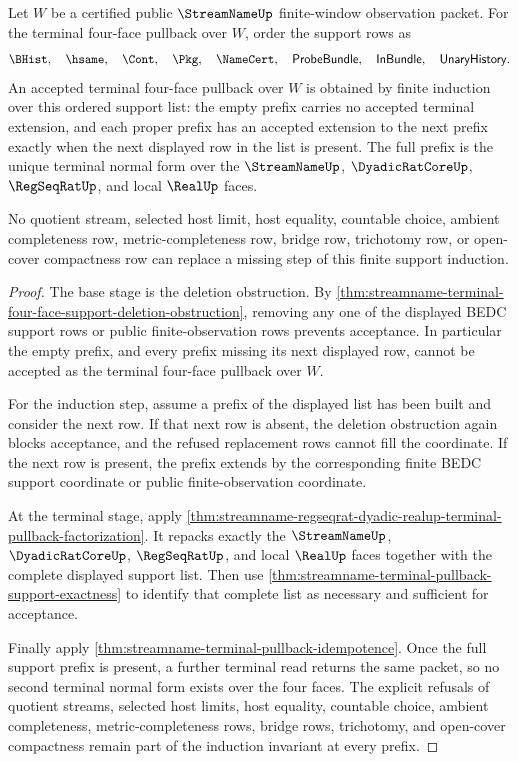 \begin{theorem}
\label{thm:streamname-terminal-pullback-support-induction}
Let $W$ be a certified public $\StreamNameUp$ finite-window observation packet.
For the terminal four-face pullback over $W$, order the support rows as
$$
\BHist,\quad \hsame,\quad \Cont,\quad \Pkg,\quad \NameCert,\quad
\mathsf{ProbeBundle},\quad \mathsf{InBundle},\quad
\mathsf{UnaryHistory}.
$$
An accepted terminal four-face pullback over $W$ is obtained by finite
induction over this ordered support list: the empty prefix carries no accepted
terminal extension, and each proper prefix has an accepted extension to the
next prefix exactly when the next displayed row in the list is present. The
full prefix is the unique terminal normal form over the $\StreamNameUp$,
$\DyadicRatCoreUp$, $\RegSeqRatUp$, and local $\RealUp$ faces.

No quotient stream, selected host limit, host equality, countable choice,
ambient completeness row, metric-completeness row, bridge row, trichotomy row,
or open-cover compactness row can replace a missing step of this finite
support induction.
\end{theorem}
\begin{proof}
The base stage is the deletion obstruction. By
\autoref{thm:streamname-terminal-four-face-support-deletion-obstruction},
removing any one of the displayed BEDC support rows or public
finite-observation rows prevents acceptance. In particular the empty prefix,
and every prefix missing its next displayed row, cannot be accepted as the
terminal four-face pullback over $W$.

For the induction step, assume a prefix of the displayed list has been built
and consider the next row. If that next row is absent, the deletion obstruction
again blocks acceptance, and the refused replacement rows cannot fill the
coordinate. If the next row is present, the prefix extends by the corresponding
finite BEDC support coordinate or public finite-observation coordinate.

At the terminal stage, apply
\autoref{thm:streamname-regseqrat-dyadic-realup-terminal-pullback-factorization}.
It repacks exactly the $\StreamNameUp$, $\DyadicRatCoreUp$, $\RegSeqRatUp$,
and local $\RealUp$ faces together with the complete displayed support list.
Then use \autoref{thm:streamname-terminal-pullback-support-exactness} to
identify that complete list as necessary and sufficient for acceptance.

Finally apply \autoref{thm:streamname-terminal-pullback-idempotence}. Once the
full support prefix is present, a further terminal read returns the same
packet, so no second terminal normal form exists over the four faces. The
explicit refusals of quotient streams, selected host limits, host equality,
countable choice, ambient completeness, metric-completeness rows, bridge rows,
trichotomy, and open-cover compactness remain part of the induction invariant
at every prefix.
\end{proof}

